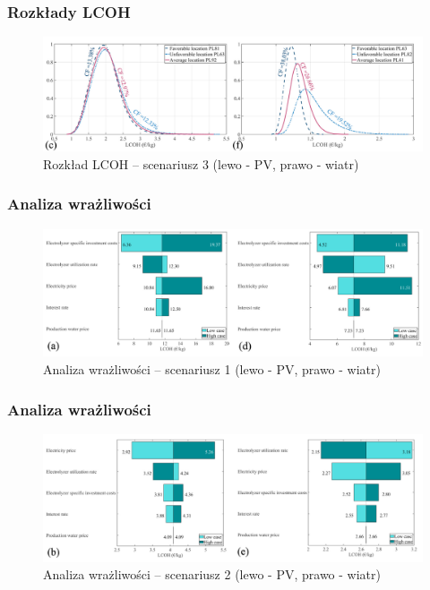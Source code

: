 \documentclass{beamer}
\begin{document}
\begin{frame}[noframenumbering]
	\frametitle{Rozkłady LCOH}
	\begin{figure}
		\begin{center}
			\includegraphics[width=\textwidth]{mmc-results-charts-3.png}
		\end{center}
		\caption{Rozkład LCOH -- scenariusz 3 (lewo - PV, prawo - wiatr)}
	\end{figure}
\end{frame}


\begin{frame}
	\frametitle{Analiza wrażliwości}
	\begin{figure}
		\begin{center}
			\includegraphics[width=\textwidth]{mmc-results-tornados-1.png}
		\end{center}
		\caption{Analiza wrażliwości -- scenariusz 1 (lewo - PV, prawo - wiatr)}
	\end{figure}
\end{frame}

\begin{frame}[noframenumbering]
	\frametitle{Analiza wrażliwości}
	\begin{figure}
		\begin{center}
			\includegraphics[width=\textwidth]{mmc-results-tornados-2.png}
		\end{center}
		\caption{Analiza wrażliwości -- scenariusz 2 (lewo - PV, prawo - wiatr)}
	\end{figure}
\end{frame}
\end{document}
